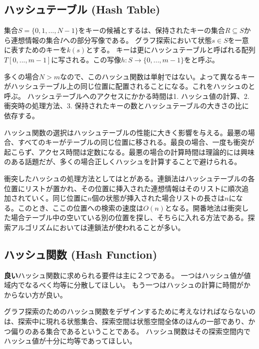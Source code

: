 \subsection{ハッシュテーブル (Hash Table)}
\label{sec:hash-table}

集合$S = \{0, 1, ..., N - 1\}$をキーの候補とするは、保持されたキーの集合$R \subseteq S$から連想情報の集合$I$への部分写像である。
グラフ探索において状態$s \in S$を一意に表すためのキーを$k(s)$とする。
キーは更にハッシュテーブルと呼ばれる配列$T[0, ..., m-1]$に写される。この写像$h: S \rightarrow \{0, ..., m-1\}$をと呼ぶ。

多くの場合$N > m$なので、このハッシュ関数は単射ではない。よって異なるキーがハッシュテーブル上の同じ位置に配置されることになる。これをハッシュのと呼ぶ。
ハッシュテーブルへのアクセスにかかる時間は1. ハッシュ値の計算、2. 衝突時の処理方法、3. 保持されたキーの数とハッシュテーブルの大きさの比に依存する。

ハッシュ関数の選択はハッシュテーブルの性能に大きく影響を与える。最悪の場合、すべてのキーがテーブルの同じ位置に移される。最良の場合、一度も衝突が起こらず、アクセス時間は定数になる。最悪の場合の計算時間は理論的には興味のある話題だが、多くの場合正しくハッシュを計算することで避けられる。

衝突したハッシュの処理方法としてはとがある。連鎖法はハッシュテーブルの各位置にリストが置かれ、その位置に挿入された連想情報はそのリストに順次追加されていく。同じ位置に$n$個の状態が挿入された場合リストの長さは$n$になる。このとき、ここの位置への検索の速度は$O(n)$となる。開番地法は衝突した場合テーブル中の空いている別の位置を探し、そちらに入れる方法である。探索アルゴリズムにおいては連鎖法が使われることが多い。


\subsection{ハッシュ関数 (Hash Function)}
\label{sec:hash-function}

{\bf 良い}ハッシュ関数に求められる要件は主に２つである。
一つはハッシュ値が値域内でなるべく均等に分散してほしい。
もう一つはハッシュの計算に時間がかからない方が良い。

グラフ探索のためのハッシュ関数をデザインするために考えなければならないのは、探索中に現れる状態集合、探索空間は状態空間全体のほんの一部であり、かつ偏りのある集合であるということである。
ハッシュ関数はその探索空間内でハッシュ値が十分に均等であってほしい。


